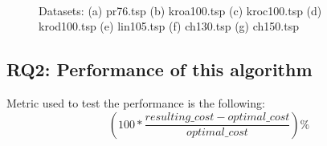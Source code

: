\documentclass[a4paper]{article}
\begin{document}
{\begin{center}
\begin{figure}[H]
	\hspace{8pt}%
	 \\
	
	\caption[]{Datasets: (a) pr76.tsp (b) kroa100.tsp (c) kroc100.tsp (d) krod100.tsp (e) lin105.tsp (f) ch130.tsp (g) ch150.tsp}%
	\label{fig5}%
\end{figure}
\end{center}


\subsection{RQ2: Performance of this algorithm}
Metric used to test the performance is the following:
\[ \left( 100 * \frac{resulting\_cost - optimal\_cost}{optimal\_cost} \right)\% \]

}
\end{document}
